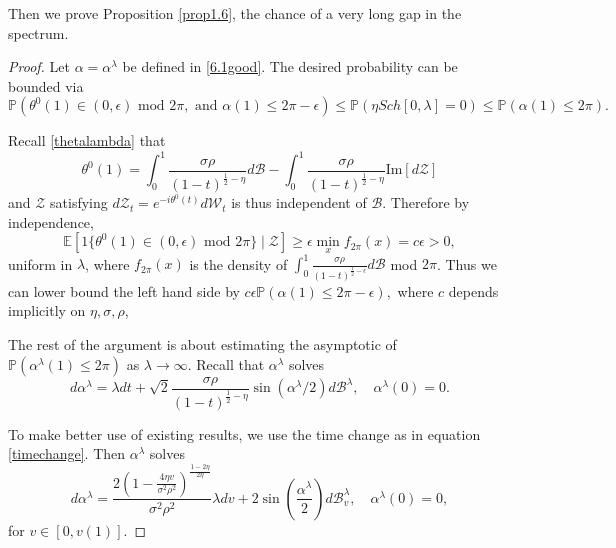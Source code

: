 \documentclass[12pt, reqno]{amsart}
\theoremstyle{definition}
\theoremstyle{remark}
\numberwithin{equation}{section}
\begin{document}
Then we prove Proposition \ref{prop1.6}, the chance of a very long gap in the spectrum.
\begin{proof}
    Let $\alpha=\alpha^\lambda$ be defined in \eqref{6.1good}. The desired probability can be bounded via
    \begin{equation}
        \mathbb{P}(\theta^0(1)\in(0,\epsilon)\text{ mod }2\pi,\text{ and }\alpha(1)\leq 2\pi-\epsilon)\leq\mathbb{P}(\eta Sch[0,\lambda]=0)\leq\mathbb{P}(\alpha(1)\leq 2\pi).
    \end{equation}

Recall \eqref{thetalambda} that $$\theta^0(1)=\int_0^1 \frac{\sigma\rho}{(1-t)^{\frac{1}{2}-\eta}}d\mathcal{B}-\int_0^1 \frac{\sigma\rho}{(1-t)^{\frac{1}{2}-\eta}}\text{Im}[d\mathcal{Z}]$$ and $\mathcal{Z}$ satisfying $d\mathcal{Z}_t=e^{-i\theta^0(t)}d\mathcal{W}_t$ is thus independent of $\mathcal{B}$. Therefore by independence, 
$$\mathbb{E}[1\{\theta^0(1)\in(0,\epsilon)\text{ mod }2\pi\}\mid\mathcal{Z}]\geq\epsilon\min_x f_{2\pi}(x)=c\epsilon>0,$$ uniform in $\lambda$, where $f_{2\pi}(x)$ is the density of $\int_0^1 \frac{\sigma\rho}{(1-t)^{\frac{1}{2}-\epsilon}}d\mathcal{B}$ mod $2\pi$. Thus we can lower bound the left hand side by $c\epsilon \mathbb{P}(\alpha(1)\leq 2\pi-\epsilon),$ where $c$ depends implicitly on $\eta,\sigma,\rho$, 

The rest of the argument is about estimating the asymptotic of $\mathbb{P}(\alpha^\lambda(1)\leq 2\pi)$ as $\lambda\to\infty$. Recall that $\alpha^\lambda$ solves \begin{equation}
    d\alpha^\lambda=\lambda dt+\sqrt{2}\frac{\sigma\rho}{(1-t)^{\frac{1}{2}-\eta}}\sin(\alpha^\lambda/2)d\mathcal{B}^\lambda,\quad \alpha^\lambda(0)=0.
\end{equation} 

To make better use of existing results, we use the time change as in equation \eqref{timechange}. Then $\alpha^\lambda$ solves  
\begin{equation}
    d\alpha^\lambda=\frac{2(1-\frac{4\eta v}{\sigma^2\rho^2})^{\frac{1-2\eta}{2\eta}}}{\sigma^2\rho^2}\lambda dv+2\sin(\frac{\alpha^\lambda}{2})d\mathcal{B}^\lambda_v,\quad \alpha^\lambda(0)=0,
\end{equation} for $v\in[0,v(1)]$. 


\end{proof}
\end{document}
